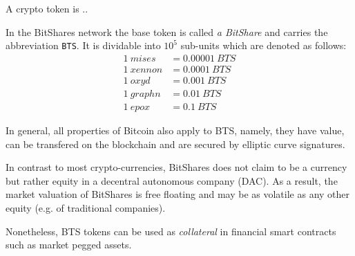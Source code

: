 A crypto token is .. %

In the BitShares network the base token is called \emph{a BitShare} and carries
the abbreviation \texttt{BTS}. It is dividable into $10^5$ sub-units which are
denoted as follows:
\begin{align*}
\SI{1}{mises } &= \SI{0.00001}{BTS}\\
\SI{1}{xennon} &= \SI{0.0001}{BTS}\\
\SI{1}{oxyd  } &= \SI{0.001}{BTS}\\
\SI{1}{graphn} &= \SI{0.01}{BTS}\\
\SI{1}{epox  } &= \SI{0.1}{BTS}
\end{align*}

In general, all properties of Bitcoin also apply to BTS, namely, they have
value, can be transfered on the blockchain and are secured by elliptic curve
signatures.

In contrast to most crypto-currencies, BitShares does not claim to be a currency
but rather equity in a decentral autonomous company (DAC). As a result, the
market valuation of BitShares is free floating and may be as volatile as any
other equity (e.g. of traditional companies).

Nonetheless, BTS tokens can be used as \emph{collateral} in financial smart
contracts~\cite{bts:financial} such as market pegged assets.


